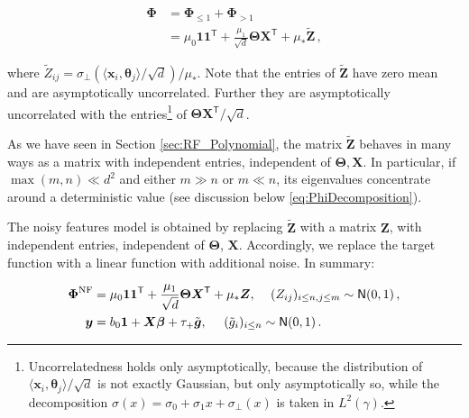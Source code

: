 \begin{align*}

  {\boldsymbol \Phi} &= {\boldsymbol \Phi}_{\le 1}+ {\boldsymbol \Phi}_{>1}\\
        & = \mu_0\ensuremath{\mathbf{1}}\ensuremath{\mathbf{1}}^{{\mathsf T}}+\frac{\mu_1}{\sqrt{d}}{\boldsymbol \Theta}{\boldsymbol X}^{{\mathsf T}}+\mu_*\tilde{\boldsymbol Z}\, ,

\end{align*}

where $\tilde{Z}_{ij} = \sigma_{\perp}(\langle{\boldsymbol x}_i,{\boldsymbol \theta}_j\rangle/\sqrt{d})/\mu_*$.
Note that the entries of $\tilde{\boldsymbol Z}$ have zero mean and are asymptotically uncorrelated. Further they are asymptotically uncorrelated with the entries\footnote{Uncorrelatedness holds only asymptotically, because the distribution of $\langle{\boldsymbol x}_i,{\boldsymbol \theta}_j\rangle/\sqrt{d}$ is not exactly Gaussian, but only asymptotically so, while the decomposition $\sigma(x) = \sigma_0+\sigma_1x+\sigma_{\perp}(x)$ is taken in $L^2(\gamma)$.}    of
${\boldsymbol \Theta}{\boldsymbol X}^{{\mathsf T}}/\sqrt{d}$.

As we have seen in Section \ref{sec:RF_Polynomial}, the matrix $\tilde{\boldsymbol Z}$ behaves in many ways as a matrix with independent entries, independent of ${\boldsymbol \Theta},{\boldsymbol X}$. In particular, if $\max(m,n)\ll d^2$ and either $m\gg n$ or $m\ll n$, its eigenvalues concentrate around a deterministic value (see discussion below \eqref{eq:PhiDecomposition}).

The noisy features model is obtained by replacing $\tilde{\boldsymbol Z}$ with a matrix ${\boldsymbol Z}$, with independent entries, independent of
${\boldsymbol \Theta}$, ${\boldsymbol X}$. Accordingly, we replace the target function with a linear function with additional noise. In summary:

\begin{align}

  {\boldsymbol \Phi}^{{\rm NF}} &= \mu_0\ensuremath{\mathbf{1}}\ensuremath{\mathbf{1}}^{{\mathsf T}}+\frac{\mu_1}{\sqrt{d}}{\boldsymbol \Theta}{\boldsymbol X}^{{\mathsf T}}+\mu_*{\boldsymbol Z},\, \,\;\;\; (Z_{ij})_{i\le n, j\le m}\sim {\sf N}(0,1)\, ,\\
  {\boldsymbol y} & = b_0\ensuremath{\mathbf{1}} + {\boldsymbol X}{\boldsymbol \beta} + \tau_+ \tilde{\boldsymbol g}, \, \, \,\;\;\; (\tilde{g}_{i})_{i\le n}\sim {\sf N}(0,1)\,  .

\end{align}

